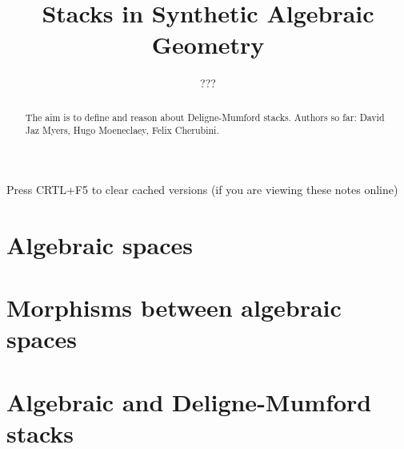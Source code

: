 \documentclass{../util/zariski}
\title{Stacks in Synthetic Algebraic Geometry}
\author{???}
\begin{document}
\maketitle

\begin{center}
  \color{purple}
  \large{Press CRTL+F5 to clear cached versions}
  \large{(if you are viewing these notes online)}
\end{center}

\begin{abstract}
  The aim is to define and reason about Deligne-Mumford stacks.
  Authors so far: David Jaz Myers, Hugo Moeneclaey, Felix Cherubini.
\end{abstract}

\tableofcontents

\section{Algebraic spaces}


\section{Morphisms between algebraic spaces}


\section{Algebraic and Deligne-Mumford stacks}


\printindex

\printbibliography
\end{document}
